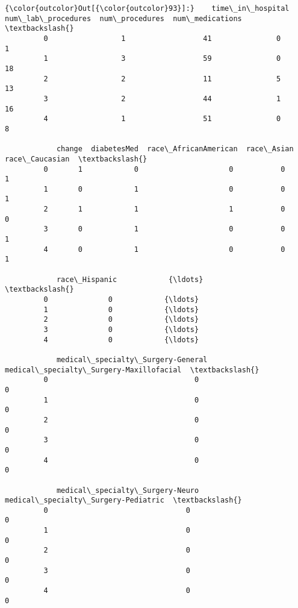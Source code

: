 \documentclass[11pt]{article}
\begin{document}
\begin{Verbatim}[commandchars=\\\{\}]
{\color{outcolor}Out[{\color{outcolor}93}]:}    time\_in\_hospital  num\_lab\_procedures  num\_procedures  num\_medications  \textbackslash{}
         0                 1                  41               0                1   
         1                 3                  59               0               18   
         2                 2                  11               5               13   
         3                 2                  44               1               16   
         4                 1                  51               0                8   
         
            change  diabetesMed  race\_AfricanAmerican  race\_Asian  race\_Caucasian  \textbackslash{}
         0       1            0                     0           0               1   
         1       0            1                     0           0               1   
         2       1            1                     1           0               0   
         3       0            1                     0           0               1   
         4       0            1                     0           0               1   
         
            race\_Hispanic            {\ldots}              \textbackslash{}
         0              0            {\ldots}               
         1              0            {\ldots}               
         2              0            {\ldots}               
         3              0            {\ldots}               
         4              0            {\ldots}               
         
            medical\_specialty\_Surgery-General  medical\_specialty\_Surgery-Maxillofacial  \textbackslash{}
         0                                  0                                        0   
         1                                  0                                        0   
         2                                  0                                        0   
         3                                  0                                        0   
         4                                  0                                        0   
         
            medical\_specialty\_Surgery-Neuro  medical\_specialty\_Surgery-Pediatric  \textbackslash{}
         0                                0                                    0   
         1                                0                                    0   
         2                                0                                    0   
         3                                0                                    0   
         4                                0                                    0   
         

\end{Verbatim}
\end{document}
